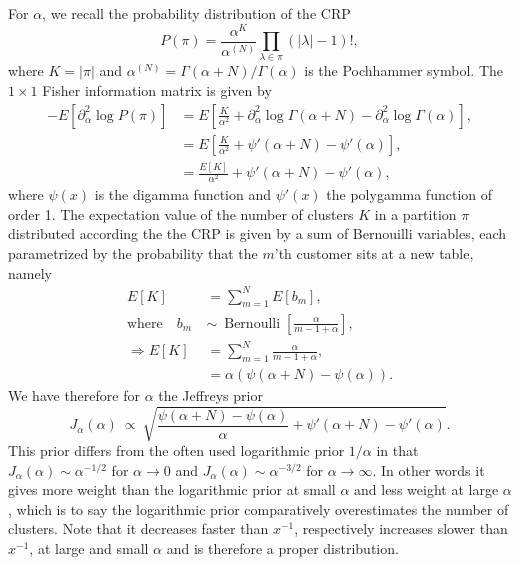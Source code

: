\documentclass[11pt, oneside]{article}   	%
\begin{document}
For $\alpha$, we recall the probability distribution of the CRP
$$P(\pi) = \frac{\alpha^K}{\alpha^{(N)}}\prod_{\lambda\in\pi}(\vert\lambda\vert - 1)!,$$
where $K = \vert\pi\vert$ and $\alpha^{(N)} = \Gamma(\alpha + N)/\Gamma(\alpha)$ is the Pochhammer symbol.
The $1\times 1$ Fisher information matrix is given by
\begin{equation}\begin{split}
-E[\partial^2_\alpha \log P(\pi)] &= E\left[\frac{K}{\alpha^2} + \partial^2_\alpha \log\Gamma(\alpha + N) - \partial^2_\alpha\log\Gamma(\alpha)\right],\\
&= E\left[\frac{K}{\alpha^2} + \psi'(\alpha + N) - \psi'(\alpha)\right],\\
&= \frac{E[K]}{\alpha^2} + \psi'(\alpha + N) - \psi'(\alpha),
\end{split}\end{equation}
where $\psi(x)$ is the digamma function and $\psi'(x)$ the polygamma function of order 1. The expectation value of the number of clusters $K$ in a partition $\pi$ distributed according the the CRP is given by a sum of Bernouilli variables, each parametrized by the probability that the $m$'th customer sits at a new table, namely
\begin{equation}\begin{split}
E[K] &= \sum_{m = 1}^N E[b_m],\\
\text{where}\quad b_m~&\sim~\operatorname{Bernoulli}\left[\frac{\alpha}{m - 1 + \alpha}\right],\\
\Rightarrow E[K] &=  \sum_{m=1}^N \frac{\alpha}{m - 1 + \alpha},\\
&= \alpha(\psi(\alpha + N) - \psi(\alpha)).
\end{split}\end{equation}
We have therefore for $\alpha$ the Jeffreys prior
\begin{equation}
J_\alpha(\alpha)~\propto~\sqrt{\frac{\psi(\alpha + N) - \psi(\alpha)}{\alpha} + \psi'(\alpha +N) - \psi'(\alpha)}.
\label{eq:jeffalpha}
\end{equation}
This prior differs from the often used logarithmic prior $1/\alpha$ in that $J_{\alpha}(\alpha) \sim \alpha^{-1/2}$ for $\alpha\rightarrow 0$ and $J_{\alpha}(\alpha) \sim\alpha^{-3/2}$ for $\alpha\rightarrow\infty$. In other words it gives more weight than the logarithmic prior at small $\alpha$ and less weight at large $\alpha$, which is to say the logarithmic prior comparatively overestimates the number of clusters. Note that it decreases faster than $x^{-1}$, respectively increases slower than $x^{-1}$, at large and small $\alpha$ and is therefore a proper distribution.
\end{document}
